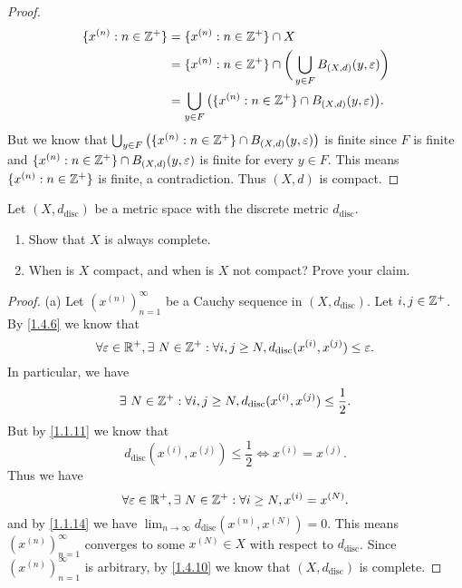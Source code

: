 \begin{proof}
\begin{align*}
    \{x^{(n)} : n \in \mathbb{Z}^+\} & = \{x^{(n)} : n \in \mathbb{Z}^+\} \cap X                                                        \\
                             & = \{x^{(n)} : n \in \mathbb{Z}^+\} \cap \bigg(\bigcup_{y \in F} B_{(X, d)}(y, \varepsilon)\bigg) \\
                             & = \bigcup_{y \in F} \big(\{x^{(n)} : n \in \mathbb{Z}^+\} \cap B_{(X, d)}(y, \varepsilon)\big).
  \end{align*}
  But we know that \(\bigcup_{y \in F} \big(\{x^{(n)} : n \in \mathbb{Z}^+\} \cap B_{(X, d)}(y, \varepsilon)\big)\) is finite since \(F\) is finite and \(\{x^{(n)} : n \in \mathbb{Z}^+\} \cap B_{(X, d)}(y, \varepsilon)\) is finite for every \(y \in F\).
  This means \(\{x^{(n)} : n \in \mathbb{Z}^+\}\) is finite, a contradiction.
  Thus \((X, d)\) is compact.
\end{proof}

\begin{ex}\label{ex:1.5.12}
  Let \((X, d_{\text{disc}})\) be a metric space with the discrete metric \(d_{\text{disc}}\).
  \begin{enumerate}
    \item Show that \(X\) is always complete.
    \item When is \(X\) compact, and when is \(X\) not compact?
          Prove your claim.
  \end{enumerate}
\end{ex}

\begin{proof}{(a)}
  Let \((x^{(n)})_{n = 1}^\infty\) be a Cauchy sequence in \((X, d_{\text{disc}})\).
  Let \(i, j \in \mathbb{Z}^+\).
  By \cref{1.4.6} we know that
  \[
    \forall \varepsilon \in \mathbb{R}^+, \exists\ N \in \mathbb{Z}^+ : \forall i, j \geq N, d_{\text{disc}}(x^{(i)}, x^{(j)}) \leq \varepsilon.
  \]
  In particular, we have
  \[
    \exists\ N \in \mathbb{Z}^+ : \forall i, j \geq N, d_{\text{disc}}(x^{(i)}, x^{(j)}) \leq \frac{1}{2}.
  \]
  But by \cref{1.1.11} we know that
  \[
    d_{\text{disc}}(x^{(i)}, x^{(j)}) \leq \frac{1}{2} \iff x^{(i)} = x^{(j)}.
  \]
  Thus we have
  \[
    \forall \varepsilon \in \mathbb{R}^+, \exists\ N \in \mathbb{Z}^+ : \forall i \geq N, x^{(i)} = x^{(N)}.
  \]
  and by \cref{1.1.14} we have \(\lim_{n \to \infty} d_{\text{disc}}(x^{(n)}, x^{(N)}) = 0\).
  This means \((x^{(n)})_{n = 1}^\infty\) converges to some \(x^{(N)} \in X\) with respect to \(d_{\text{disc}}\).
  Since \((x^{(n)})_{n = 1}^\infty\) is arbitrary, by \cref{1.4.10} we know that \((X, d_{\text{disc}})\) is complete.
\end{proof}

